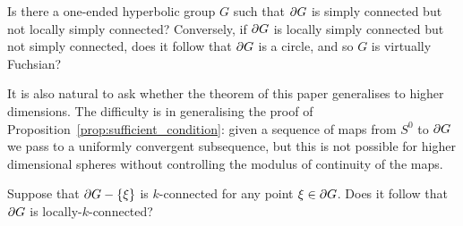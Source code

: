 \documentclass[a4paper]{article}
\begin{document}
\begin{question} Is there a one-ended hyperbolic group $G$ such that $\partial
  G$ is simply connected but not locally simply connected? Conversely, if
  $\partial G$ is locally simply connected but not simply connected, does it
  follow that $\partial G$ is a circle, and so $G$ is virtually Fuchsian?
\end{question}

It is also natural to ask whether the theorem of this paper generalises to
higher dimensions. The difficulty is in generalising the proof of
Proposition~\ref{prop:sufficient_condition}: given a sequence of maps from $S^0$
to $\partial G$ we pass to a uniformly convergent subsequence, but this is not
possible for higher dimensional spheres without controlling the modulus of
continuity of the maps.

\begin{question} Suppose that $\partial G - \left\{\xi\right\}$ is $k$-connected for any
  point $\xi \in \partial G$. Does it follow that $\partial G$ is
  locally-$k$-connected?
\end{question}


\end{document}
